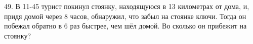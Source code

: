 49. В 11-45 турист покинул стоянку, находящуюся в 13 километрах от дома, и, придя домой через 8 часов, обнаружил, что забыл на стоянке ключи. Тогда он побежал обратно в 6 раз быстрее, чем шёл домой. Во сколько он прибежит на стоянку?\\
